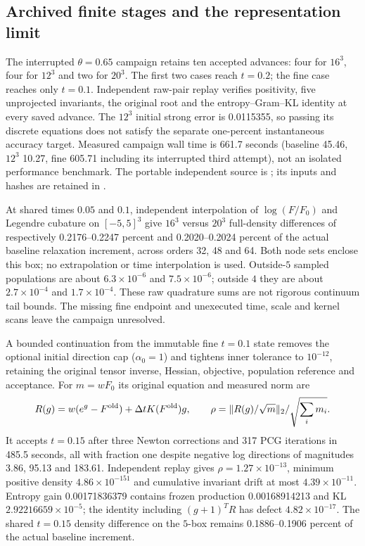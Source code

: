 \documentclass[11pt,letterpaper]{article}
\begin{document}
\subsection{Archived finite stages and the representation limit}
The interrupted $\theta=0.65$ campaign retains ten accepted advances:
four for $16^3$, four for $12^3$ and two for $20^3$. The first two cases
reach $t=0.2$; the fine case reaches only $t=0.1$. Independent raw-pair
replay verifies positivity, five unprojected invariants, the original root
and the entropy--Gram--KL identity at every saved advance. The $12^3$
initial strong error is 0.0115355, so passing its discrete equations does
not satisfy the separate one-percent instantaneous accuracy target.
Measured campaign wall time is 661.7 seconds (baseline 45.46, $12^3$ 10.27,
fine 605.71 including its interrupted third attempt), not an isolated
performance benchmark. The portable independent source is
; its inputs and hashes are retained in
.

At shared times $0.05$ and $0.1$, independent interpolation of
$\log(F/F_0)$ and Legendre cubature on $[-5,5]^3$ give $16^3$ versus
$20^3$ full-density differences of respectively 0.2176--0.2247 percent
and 0.2020--0.2024 percent of the actual baseline relaxation increment,
across orders 32, 48 and 64. Both node sets enclose this box; no
extrapolation or time interpolation is used. Outside-$5$ sampled
populations are about $6.3\times10^{-6}$ and $7.5\times10^{-6}$; outside
$4$ they are about $2.7\times10^{-4}$ and $1.7\times10^{-4}$.
These raw quadrature sums are not rigorous continuum tail bounds.
The missing fine endpoint and unexecuted time, scale and kernel scans
leave the campaign unresolved.

A bounded continuation from the immutable fine $t=0.1$ state removes the
optional initial direction cap ($\alpha_0=1$) and tightens inner tolerance
to $10^{-12}$, retaining the original tensor inverse, Hessian, objective,
population reference and acceptance. For $m=wF_0$ its original equation
and measured norm are
\[
 R(g)=w(e^g-F^{\rm old})+\Delta t K(F^{\rm old})g,
 \qquad \rho=\|R(g)/\sqrt m\|_2/\sqrt{\sum_i m_i}.
\]
It accepts $t=0.15$ after three Newton corrections and 317 PCG iterations
in 485.5 seconds, all with fraction one despite negative log directions
of magnitudes 3.86, 95.13 and 183.61. Independent replay gives
$\rho=1.27\times10^{-13}$, minimum positive density
$4.86\times10^{-151}$ and cumulative invariant drift at most
$4.39\times10^{-11}$. Entropy gain 0.00171836379 contains frozen
production 0.00168914213 and KL $2.92216659\times10^{-5}$; the identity
including $(g+1)^TR$ has defect $4.82\times10^{-17}$.
The shared $t=0.15$ density difference on the $5$-box remains
0.1886--0.1906 percent of the actual baseline increment.
\end{document}
